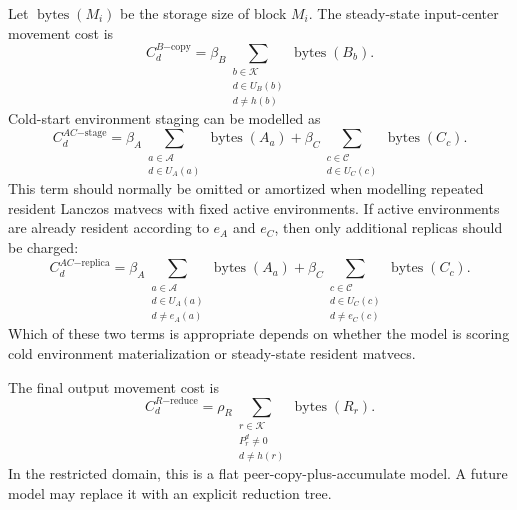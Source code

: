 \documentclass[11pt]{article}
\begin{document}
Let $\operatorname{bytes}(M_i)$ be the storage size of block $M_i$.  The
steady-state input-center movement cost is
\begin{equation}
  C^{B\mathrm{-copy}}_d =
  \beta_B
  \sum_{\substack{b \in \mathcal{K}\\d \in U_B(b)\\d \ne h(b)}}
    \operatorname{bytes}(B_b).
\end{equation}
Cold-start environment staging can be modelled as
\begin{equation}
  C^{AC\mathrm{-stage}}_d =
  \beta_A \sum_{\substack{a \in \mathcal{A}\\d \in U_A(a)}} \operatorname{bytes}(A_a)
  +
  \beta_C \sum_{\substack{c \in \mathcal{C}\\d \in U_C(c)}} \operatorname{bytes}(C_c).
\end{equation}
This term should normally be omitted or amortized when modelling repeated
resident Lanczos matvecs with fixed active environments.
If active environments are already resident according to $e_A$ and $e_C$, then
only additional replicas should be charged:
\begin{equation}
  C^{AC\mathrm{-replica}}_d =
  \beta_A \sum_{\substack{a \in \mathcal{A}\\d \in U_A(a)\\d\ne e_A(a)}} \operatorname{bytes}(A_a)
  +
  \beta_C \sum_{\substack{c \in \mathcal{C}\\d \in U_C(c)\\d\ne e_C(c)}} \operatorname{bytes}(C_c).
\end{equation}
Which of these two terms is appropriate depends on whether the model is
scoring cold environment materialization or steady-state resident matvecs.

The final output movement cost is
\begin{equation}
  C^{R\mathrm{-reduce}}_d =
  \rho_R
  \sum_{\substack{r \in \mathcal{K}\\P^d_r\ne 0\\d \ne h(r)}}
    \operatorname{bytes}(R_r).
\end{equation}
In the restricted domain, this is a flat peer-copy-plus-accumulate model.  A
future model may replace it with an explicit reduction tree.
\end{document}
